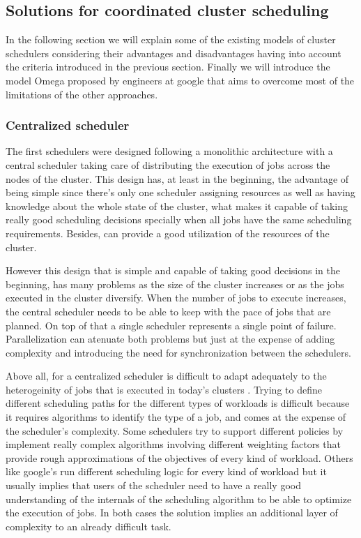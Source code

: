 \documentclass{svjour3}                     %
\begin{document}
\subsection{Solutions for coordinated cluster scheduling}

In the following section we will explain some of the existing models
of cluster schedulers considering their advantages and disadvantages
having into account the criteria introduced in the previous
section. Finally we will introduce the model Omega \cite{41684}
proposed by engineers at google that aims to overcome most of the
limitations of the other approaches.

\subsubsection{Centralized scheduler}

The first schedulers were designed following a monolithic architecture
with a central scheduler taking care of distributing the execution
of jobs across the nodes of the cluster. This design has, at least in
the beginning, the advantage of being simple since there's only one
scheduler assigning resources as well as having knowledge about the
whole state of the cluster, what makes it capable of taking really
good scheduling decisions specially when all jobs have the same
scheduling requirements. Besides, can provide a good
utilization of the resources of the cluster.

However this design that is simple and capable of taking good
decisions in the beginning, has many problems as the size of the
cluster increases or as the jobs executed in the cluster
diversify. When the number of jobs to execute increases, the central
scheduler needs to be able to keep with the pace of jobs that are
planned. On top of that a single scheduler represents a single point
of failure. Parallelization can atenuate both problems but just at the
expense of adding complexity and introducing the need for synchronization
between the schedulers.

Above all, for a centralized scheduler is difficult to adapt
adequately to the heterogeinity of jobs that is executed in today's
clusters \cite{37201}. Trying to define different
scheduling paths for the different types of workloads is difficult
because it requires algorithms to identify the type of a job, and comes
at the expense of the scheduler's complexity. Some schedulers try to
support different policies by implement really complex algorithms
involving different weighting factors that provide rough
approximations of the objectives of every kind of workload. Others
like google's run different scheduling logic for every kind of
workload but it usually implies that users of the scheduler need to
have a really good understanding of the internals of the scheduling
algorithm to be able to optimize the execution of jobs. In both cases
the solution implies an additional layer of complexity to an already
difficult task.
\end{document}
